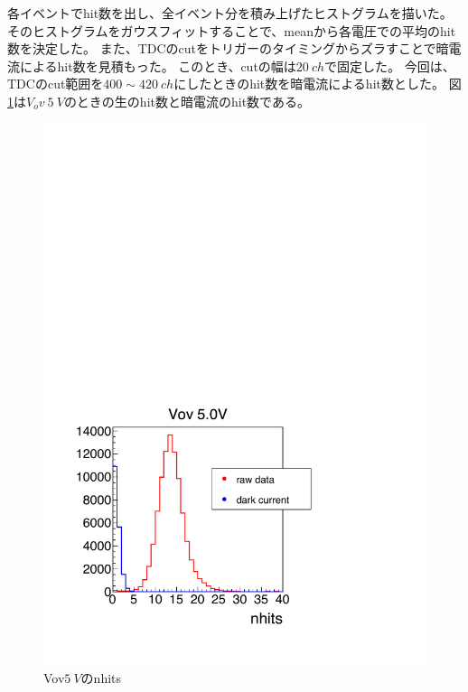 \documentclass[uplatex, titlepage, dvipdfmx, 12pt, a4paper]{jsreport}
\begin{document}
    各イベントでhit数を出し、全イベント分を積み上げたヒストグラムを描いた。
    そのヒストグラムをガウスフィットすることで、meanから各電圧での平均のhit数を決定した。
    また、TDCのcutをトリガーのタイミングからズラすことで暗電流によるhit数を見積もった。
    このとき、cutの幅は$\SI{20}{ch}$で固定した。
    今回は、TDCのcut範囲を$400\sim420\:\si{ch}$にしたときのhit数を暗電流によるhit数とした。
    図\ref{fig:nhits}は$V_ov\:\SI{5}{V}$のときの生のhit数と暗電流のhit数である。
    
    \begin{figure}[hbtp]
      \begin{center} 
        \includegraphics[scale=0.4, clip]{image/Vov5_nhits.pdf}
        \caption{Vov$\SI{5}{V}$のnhits} 
        \label{fig:nhits} 
      \end{center}
    \end{figure}
\end{document}

